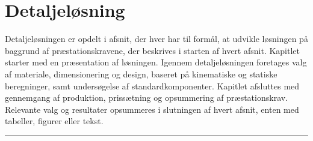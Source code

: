 \chapter{Detaljeløsning} \label{Detaljeløsning}
Detaljeløsningen er opdelt i afsnit, der hver har til formål, at udvikle løsningen på baggrund af præstationskravene, der beskrives i starten af hvert afsnit. Kapitlet starter med en præsentation af løsningen. Igennem detaljeløsningen foretages valg af materiale, dimensionering og design, baseret på kinematiske og statiske beregninger, samt undersøgelse af standardkomponenter. Kapitlet afsluttes med gennemgang af produktion, prissætning og opsummering af præstationskrav. Relevante valg og resultater opsummeres i slutningen af hvert afsnit, enten med tabeller, figurer eller tekst.   



%

\plainbreak{2}


